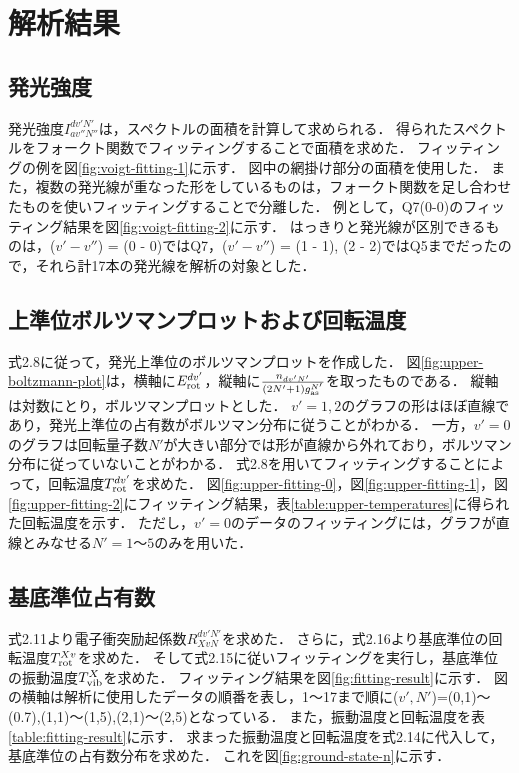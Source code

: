 \chapter{解析結果}

\section{発光強度}
発光強度$I^{dv'N'}_{av''N''}$は，スペクトルの面積を計算して求められる．
得られたスペクトルをフォークト関数でフィッティングすることで面積を求めた．
フィッティングの例を図\ref{fig:voigt-fitting-1}に示す．
図中の網掛け部分の面積を使用した．
また，複数の発光線が重なった形をしているものは，フォークト関数を足し合わせたものを使いフィッティングすることで分離した．
例として，Q7(0-0)のフィッティング結果を図\ref{fig:voigt-fitting-2}に示す．
はっきりと発光線が区別できるものは，($v'-v''$) = (0 - 0)ではQ7，($v'-v''$) = (1 - 1), (2 - 2)ではQ5までだったので，それら計17本の発光線を解析の対象とした．

\section{上準位ボルツマンプロットおよび回転温度}
式2.8に従って，発光上準位のボルツマンプロットを作成した．
図\ref{fig:upper-boltzmann-plot}は，横軸に$E^{dv'}_{\rm rot}$，縦軸に$\frac{n_{dv'N'}}{\left( 2N'+1 \right) g^{N'}_{\rm as}}$を取ったものである．
縦軸は対数にとり，ボルツマンプロットとした．
$v'=1,2$のグラフの形はほぼ直線であり，発光上準位の占有数がボルツマン分布に従うことがわかる．
一方，$v'=0$のグラフは回転量子数$N'$が大きい部分では形が直線から外れており，ボルツマン分布に従っていないことがわかる．
式2.8を用いてフィッティングすることによって，回転温度$T^{dv'}_{\rm rot}$を求めた．
図\ref{fig:upper-fitting-0}，図\ref{fig:upper-fitting-1}，図\ref{fig:upper-fitting-2}にフィッティング結果，表\ref{table:upper-temperatures}に得られた回転温度を示す．
ただし，$v'=0$のデータのフィッティングには，グラフが直線とみなせる$N'=1〜5$のみを用いた．

\section{基底準位占有数}
式2.11より電子衝突励起係数$R^{dv'N'}_{XvN}$を求めた．
さらに，式2.16より基底準位の回転温度$T^{Xv}_{\rm rot}$を求めた．
そして式2.15に従いフィッティングを実行し，基底準位の振動温度$T^{X}_{\rm vib}$を求めた．
フィッティング結果を図\ref{fig:fitting-result}に示す．
図の横軸は解析に使用したデータの順番を表し，1〜17まで順に($v',N'$)=(0,1)〜(0.7),(1,1)〜(1,5),(2,1)〜(2,5)となっている．
また，振動温度と回転温度を表\ref{table:fitting-result}に示す．
求まった振動温度と回転温度を式2.14に代入して，基底準位の占有数分布を求めた．
これを図\ref{fig:ground-state-n}に示す．